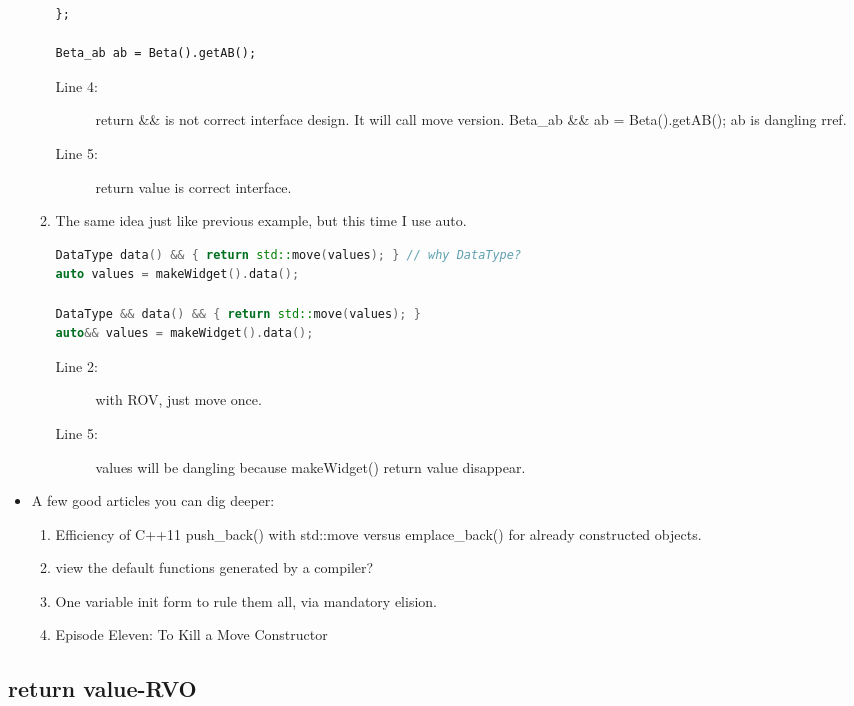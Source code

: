 \documentclass[a4paper,11pt,twoside]{book}
\begin{document}
\begin{itemize}
\begin{enumerate}
\begin{lstlisting}
};

Beta_ab ab = Beta().getAB();
\end{lstlisting}
\begin{description}
	\item[Line 4:] return \&\& is not correct interface design. It will call move version. Beta\_ab \&\& ab = Beta().getAB(); ab is dangling rref.
	\item[Line 5:] return value is correct interface.
\end{description}

			\item The same idea just like previous example, but this time I use auto.
\begin{lstlisting}[frame=single, language=c++]
DataType data() && { return std::move(values); } // why DataType?
auto values = makeWidget().data();

DataType && data() && { return std::move(values); }
auto&& values = makeWidget().data();
\end{lstlisting}
\begin{description}
	\item[Line 2:] with ROV, just move once. 
	\item[Line 5:] values will be dangling because makeWidget() return value disappear.
\end{description}

	\end{enumerate}

	\item A few good articles you can dig deeper:
	\begin{enumerate}
		\item Efficiency of C++11 push\_back() with std::move versus emplace\_back() for already constructed objects.
		\item view the default functions generated by a compiler?
		\item One variable init form to rule them all, via mandatory elision.
		\item Episode Eleven: To Kill a Move Constructor
	\end{enumerate}

\end{itemize}

\subsection{return value-RVO}
\end{document}
